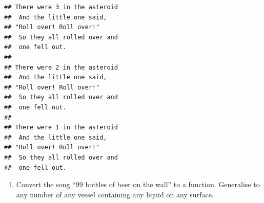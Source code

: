 \documentclass[]{book}
\newenvironment{Shaded}{\begin{snugshade}}{\end{snugshade}}
\newcommand{\CharTok}[1]{\textcolor[rgb]{0.31,0.60,0.02}{#1}}
\newcommand{\ControlFlowTok}[1]{\textcolor[rgb]{0.13,0.29,0.53}{\textbf{#1}}}
\newcommand{\DataTypeTok}[1]{\textcolor[rgb]{0.13,0.29,0.53}{#1}}
\newcommand{\DecValTok}[1]{\textcolor[rgb]{0.00,0.00,0.81}{#1}}
\newcommand{\KeywordTok}[1]{\textcolor[rgb]{0.13,0.29,0.53}{\textbf{#1}}}
\newcommand{\NormalTok}[1]{#1}
\newcommand{\OperatorTok}[1]{\textcolor[rgb]{0.81,0.36,0.00}{\textbf{#1}}}
\newcommand{\StringTok}[1]{\textcolor[rgb]{0.31,0.60,0.02}{#1}}
\providecommand{\tightlist}{%
  \setlength{\itemsep}{0pt}\setlength{\parskip}{0pt}}
\theoremstyle{definition}
\theoremstyle{definition}
\theoremstyle{definition}
\theoremstyle{remark}
\begin{document}
\begin{enumerate}
\begin{Shaded}
\end{Shaded}

\begin{verbatim}
## There were 3 in the asteroid
##  And the little one said, 
## "Roll over! Roll over!"
##  So they all rolled over and
##  one fell out.
## 
## There were 2 in the asteroid
##  And the little one said, 
## "Roll over! Roll over!"
##  So they all rolled over and
##  one fell out.
## 
## There were 1 in the asteroid
##  And the little one said, 
## "Roll over! Roll over!"
##  So they all rolled over and
##  one fell out.
\end{verbatim}

  \begin{enumerate}
  \def\labelenumii{\arabic{enumii}.}
  \tightlist
  \item
    Convert the song ``99 bottles of beer on the wall'' to a function.
    Generalise to any number of any vessel containing any liquid on any
    surface.
  \end{enumerate}


\end{enumerate}
\end{document}
